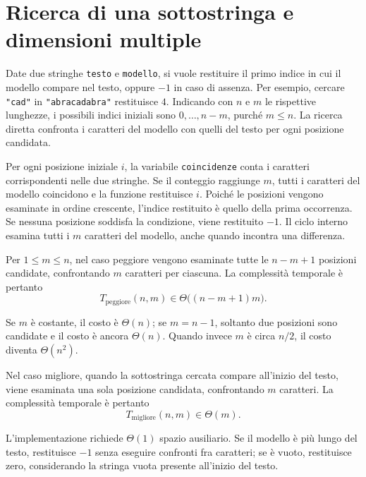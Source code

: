 \clearpage

\section{Ricerca di una sottostringa e dimensioni multiple}
\label{sec:fi-complessita-sottostringa}

Date due stringhe \texttt{testo} e \texttt{modello}, si vuole
restituire il primo indice in cui il modello compare nel testo,
oppure \(-1\) in caso di assenza. Per esempio, cercare
\texttt{"cad"} in \texttt{"abracadabra"} restituisce \(4\).
Indicando con \(n\) e \(m\) le rispettive lunghezze, i possibili
indici iniziali sono \(0,\ldots,n-m\), purché \(m\le n\).
La ricerca diretta confronta i caratteri del modello con quelli
del testo per ogni posizione candidata.



Per ogni posizione iniziale \(i\), la variabile
\texttt{coincidenze} conta i caratteri corrispondenti nelle due
stringhe. Se il conteggio raggiunge \(m\), tutti i caratteri
del modello coincidono e la funzione restituisce \(i\).
Poiché le posizioni vengono esaminate in ordine crescente,
l'indice restituito è quello della prima occorrenza.
Se nessuna posizione soddisfa la condizione, viene restituito \(-1\).
Il ciclo interno esamina tutti i \(m\) caratteri del modello, anche
quando incontra una differenza.

Per \(1\le m\le n\), nel caso peggiore vengono esaminate tutte
le \(n-m+1\) posizioni candidate, confrontando \(m\) caratteri
per ciascuna. La complessità temporale è pertanto
\[
  T_{\mathrm{peggiore}}(n,m)
  \in\Theta\bigl((n-m+1)m\bigr).
\]

Se \(m\) è costante, il costo è \(\Theta(n)\); se \(m=n-1\),
soltanto due posizioni sono candidate e il costo è ancora
\(\Theta(n)\). Quando invece \(m\) è circa \(n/2\), il costo
diventa \(\Theta(n^2)\).

Nel caso migliore, quando la sottostringa cercata compare all'inizio
del testo, viene esaminata una sola posizione candidata, confrontando
\(m\) caratteri. La complessità temporale è pertanto
\[
  T_{\mathrm{migliore}}(n,m)
  \in\Theta(m).
\]

L'implementazione richiede \(\Theta(1)\) spazio ausiliario.
Se il modello è più lungo del testo, restituisce \(-1\) senza
eseguire confronti fra caratteri; se è vuoto, restituisce
zero, considerando la stringa vuota presente all'inizio del testo.


